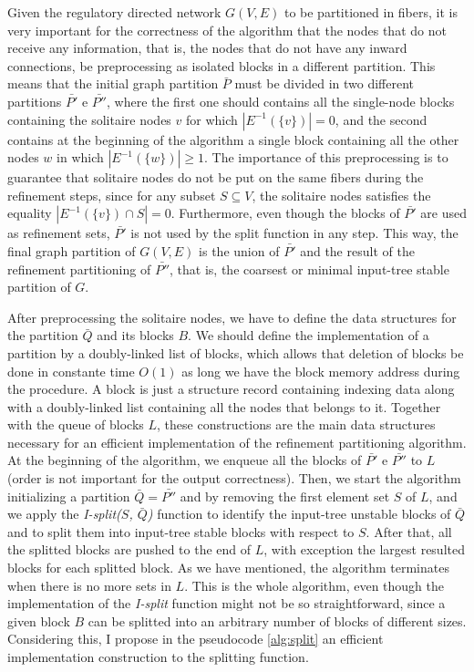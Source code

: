 \documentclass[12pt]{diazessay} %
\begin{document}
Given the regulatory directed network $G(V, E)$ to be partitioned in fibers, it is very important for the correctness of the algorithm that the nodes that do not receive any information, that is, the nodes that do not have any inward connections, be preprocessing as isolated blocks in a different partition. This means that the initial graph partition $\bar{P}$ must be divided in two different partitions $\bar{P'}$ e $\bar{P''}$, where the first one should contains all the single-node blocks containing the solitaire nodes $v$ for which $| E^{-1}(\{v\}) | = 0$, and the second contains at the beginning of the algorithm a single block containing all the other nodes $w$ in which $| E^{-1}(\{w\}) | \geq 1$. The importance of this preprocessing is to guarantee that solitaire nodes do not be put on the same fibers during the refinement steps, since for any subset $S \subseteq V$, the solitaire nodes satisfies the equality $| E^{-1}(\{v\}) \cap S | = 0$. Furthermore, even though the blocks of $\bar{P'}$ are used as refinement sets, $\bar{P'}$ is not used by the split function in any step. This way, the final graph partition of $G(V, E)$ is the union of $\bar{P'}$ and the result of the refinement partitioning of $\bar{P''}$, that is, the coarsest or minimal input-tree stable partition of $G$.

After preprocessing the solitaire nodes, we have to define the data structures for the partition $\bar{Q}$ and its blocks $B$. We should define the implementation of a partition by a doubly-linked list of blocks, which allows that deletion of blocks be done in constante time $O(1)$ as long we have the block memory address during the procedure. A block is just a structure record containing indexing data along with a doubly-linked list containing all the nodes that belongs to it. Together with the queue of blocks $L$, these constructions are the main data structures necessary for an efficient implementation of the refinement partitioning algorithm. At the beginning of the algorithm, we enqueue all the blocks of $\bar{P'}$ e $\bar{P''}$ to $L$ (order is not important for the output correctness). Then, we start the algorithm initializing a partition $\bar{Q} = \bar{P''}$ and by removing the first element set $S$ of $L$, and we apply the \textit{I-split($S$, $\bar{Q}$)} function to identify the input-tree unstable blocks of $\bar{Q}$ and to split them into input-tree stable blocks with respect to $S$. After that, all the splitted blocks are pushed to the end of $L$, with exception the largest resulted blocks for each splitted block. As we have mentioned, the algorithm terminates when there is no more sets in $L$. This is the whole algorithm, even though the implementation of the \textit{I-split} function might not be so straightforward, since a given block $B$ can be splitted into an arbitrary number of blocks of different sizes. Considering this, I propose in the pseudocode \ref{alg:split} an efficient implementation construction to the splitting function.
\end{document}
